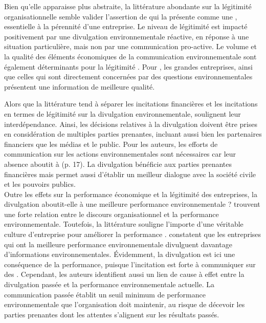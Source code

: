             Bien qu'elle apparaisse plus abstraite, la littérature abondante sur la légitimité organisationnelle semble valider l'assertion de \textcite{suchman1995managing} qui la présente comme une , essentielle à la pérennité d'une entreprise.
            Le niveau de légitimité est impacté positivement par une divulgation environnementale réactive, en réponse à une situation particulière, mais non par une communication pro-active. Le volume et la qualité des éléments économiques de la communication environnementale sont également déterminants pour la légitimité \parencite{aerts2008corporate}. Pour \textcite{brammer2008factors}, les grandes entreprises, ainsi que celles qui sont directement concernées par des questions environnementales présentent une information de meilleure qualité.

            Alors que la littérature tend à séparer les incitations financières et les incitations en termes de légitimité sur la divulgation environnementale, \textcite{cormier2015economic} soulignent leur interdépendance. Ainsi, les décisions relatives à la divulgation  doivent être prises en considération de multiples parties prenantes, incluant aussi bien les partenaires financiers que les médias et le public. Pour les auteurs, les efforts de communication sur les actions environnementales sont nécessaires car leur absence aboutit à  (p. 17). La divulgation bénéficie aux parties prenantes financières mais permet aussi d'établir un meilleur dialogue avec la société civile et les pouvoirs publics. \\

            Outre les effets sur la performance économique et la légitimité des entreprises, la divulgation aboutit-elle à une meilleure performance environnementale ? \textcite{vazquez2008corporate} trouvent une forte relation entre le discours organisationnel et la performance environnementale. Toutefois, la littérature souligne l'importe d'une véritable culture d'entreprise pour améliorer la performance \parencite{crane2017rhetoric}. \textcite{al-tuwaijri2003relations} constatent que les entreprises qui ont la meilleure performance environnementale divulguent davantage d'informations environnementales. Évidemment, la divulgation est ici une conséquence de la performance, puisque l'incitation est forte à communiquer sur des . Cependant, les auteurs identifient aussi un lien de cause à effet entre la divulgation passée et la performance environnementale actuelle. La communication passée établit un seuil minimum de performance environnementale que l'organisation doit maintenir, au risque de décevoir les parties prenantes dont les attentes s'alignent sur les résultats passés.



